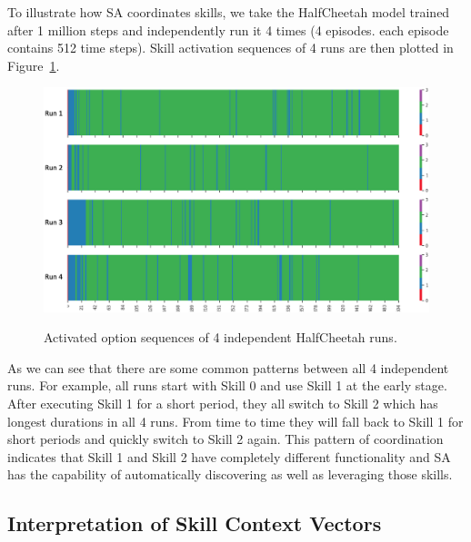 To illustrate how SA coordinates skills, we take the HalfCheetah
model trained after 1 million steps and independently run it 4
times (4 episodes. each episode contains 512 time steps). Skill
activation sequences of 4 runs are then plotted in
Figure~\ref{fig:option_pattern}.
\begin{figure}[h]
  \centering
  \includegraphics[width=0.7\linewidth]{./Part1/figures/option_pattern.png}\\
  \caption{\label{fig:option_pattern} Activated option sequences
    of 4 independent HalfCheetah runs.}
\end{figure}
As we can see that there are some common patterns between all 4
independent runs. For example, all runs start with Skill 0 and
use Skill 1 at the early stage. After executing Skill 1 for a
short period, they all switch to Skill 2 which has longest
durations in all 4 runs. From time to time they will fall back to
Skill 1 for short periods and quickly switch to Skill 2 again.
This pattern of coordination indicates that Skill 1 and Skill 2
have completely different functionality and SA has the capability
of automatically discovering as well as leveraging those skills.

\subsection{Interpretation of Skill Context Vectors}
\label{sec:interpret}

